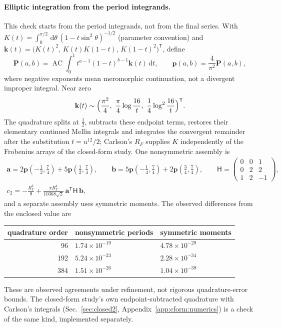 \documentclass[11pt,a4paper]{article}
\numberwithin{equation}{section}
\newcommand{\dd}{\,\mathrm d}
\newcommand{\AC}{\operatorname{AC}}
\newcommand{\sci}[2]{#1\times10^{#2}}
\begin{document}
\paragraph{Elliptic integration from the period integrands.} This check starts from the period integrands, not from the final series.
With $K(t)=\int_0^{\pi/2}\dd\theta\,(1-t\sin^2\theta)^{-1/2}$ (parameter convention) and
$\mathbf k(t)=\bigl(K(t)^2,\,K(t)K(1-t),\,K(1-t)^2\bigr)^{\mathsf T}$, define
\begin{equation}
 \mathbf P(a,b)=\AC\!\int_0^1t^{a-1}(1-t)^{b-1}\mathbf k(t)\dd t,\qquad \mathbf p(a,b)=\frac4{\pi^2}\mathbf P(a,b),
\end{equation}
where negative exponents mean meromorphic continuation, not a divergent improper integral. Near zero
\begin{equation}
 \mathbf k(t)\sim\Bigl(\frac{\pi^2}4,\ \frac\pi4\log\frac{16}t,\ \frac14\log^2\frac{16}t\Bigr)^{\mathsf T}.
\end{equation}
The quadrature splits at $\frac12$, subtracts these endpoint terms, restores their elementary continued Mellin
integrals and integrates the convergent remainder after the substitution $t=u^{12}/2$; Carlson's $R_F$ supplies $K$
independently of the Frobenius arrays of the closed-form study. One nonsymmetric assembly is
\begin{equation}
\begin{gathered}
 \mathbf a=2\mathbf p(-\tfrac12,\tfrac74)+5\mathbf p(\tfrac12,\tfrac74),\qquad
 \mathbf b=5\mathbf p(-\tfrac14,\tfrac74)+2\mathbf p(\tfrac34,\tfrac74),\qquad
 \mathsf H=\begin{pmatrix}0&0&1\\0&2&2\\1&2&-1\end{pmatrix},\\
 c_2=-\frac{R_\Gamma^2}9+\frac{\pi R_\Gamma^4}{10368\sqrt2}\,\mathbf a^{\mathsf T}\mathsf H\,\mathbf b,
\end{gathered}
\end{equation}
and a separate assembly uses symmetric moments. The observed differences from the enclosed value are
\begin{center}\small
\begin{tabular}{@{}rll@{}}
\toprule
quadrature order & nonsymmetric periods & symmetric moments\\
\midrule
96 & $\sci{1.74}{-19}$ & $\sci{4.78}{-29}$\\
192 & $\sci{5.24}{-23}$ & $\sci{2.28}{-34}$\\
384 & $\sci{1.51}{-26}$ & $\sci{1.04}{-39}$\\
\bottomrule
\end{tabular}
\end{center}
These are observed agreements under refinement, not rigorous quadrature-error bounds. The closed-form study's own
endpoint-subtracted quadrature with Carlson's integrals (Sec.~\ref{sec:closed2}, Appendix~\ref{app:cform:numerics}) is a check of the same kind,
implemented separately.
\end{document}
